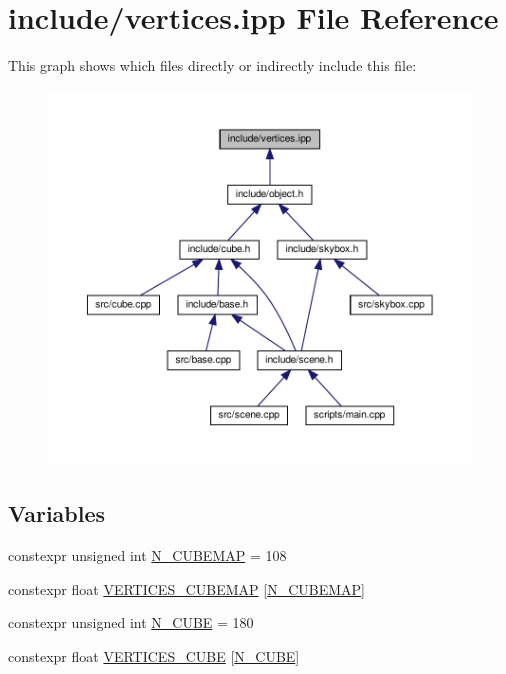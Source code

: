 \hypertarget{vertices_8ipp}{}\section{include/vertices.ipp File Reference}
\label{vertices_8ipp}
This graph shows which files directly or indirectly include this file\+:
\nopagebreak
\begin{figure}[H]
\begin{center}
\leavevmode
\includegraphics[width=350pt]{vertices_8ipp__dep__incl}
\end{center}
\end{figure}
\subsection*{Variables}
\begin{DoxyCompactItemize}
\item 
constexpr unsigned int \hyperlink{vertices_8ipp_a39a32dc114182d94339637ef1d33a5f3}{N\+\_\+\+C\+U\+B\+E\+M\+AP} = 108
\item 
constexpr float \hyperlink{vertices_8ipp_adac638aee82b5d75cf31b90b2f267f69}{V\+E\+R\+T\+I\+C\+E\+S\+\_\+\+C\+U\+B\+E\+M\+AP} \mbox{[}\hyperlink{vertices_8ipp_a39a32dc114182d94339637ef1d33a5f3}{N\+\_\+\+C\+U\+B\+E\+M\+AP}\mbox{]}
\item 
constexpr unsigned int \hyperlink{vertices_8ipp_a6996accf1133a5f4f485328b0c687bbd}{N\+\_\+\+C\+U\+BE} = 180
\item 
constexpr float \hyperlink{vertices_8ipp_acd4fffe6aa1e9ab55bc18cc601eb677a}{V\+E\+R\+T\+I\+C\+E\+S\+\_\+\+C\+U\+BE} \mbox{[}\hyperlink{vertices_8ipp_a6996accf1133a5f4f485328b0c687bbd}{N\+\_\+\+C\+U\+BE}\mbox{]}
\end{DoxyCompactItemize}


